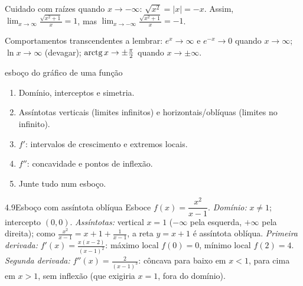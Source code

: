 \begin{nota}
Cuidado com raízes quando $x\to-\infty$: $\sqrt{x^2}=|x|=-x$. Assim,
$\lim_{x\to\infty}\frac{\sqrt{x^2+1}}{x}=1$, mas $\lim_{x\to-\infty}\frac{\sqrt{x^2+1}}{x}=-1$.
\end{nota}

Comportamentos transcendentes a lembrar: $e^x\to\infty$ e $e^{-x}\to0$ quando $x\to\infty$;
$\ln x\to\infty$ (devagar); $\operatorname{arctg} x\to\pm\frac\pi2$ quando $x\to\pm\infty$.

\begin{estrategia}{esboço do gráfico de uma função}
\begin{enumerate}[label=\arabic*.]
\item Domínio, interceptos e simetria.
\item Assíntotas verticais (limites infinitos) e horizontais/oblíquas (limites no infinito).
\item $f'$: intervalos de crescimento e extremos locais.
\item $f''$: concavidade e pontos de inflexão.
\item Junte tudo num esboço.
\end{enumerate}
\end{estrategia}

\begin{exemplo}{4.9}{Esboço com assíntota oblíqua}
Esboce $f(x)=\dfrac{x^2}{x-1}$.
\solucao
\emph{Domínio:} $x\neq1$; intercepto $(0,0)$. \emph{Assíntotas:} vertical $x=1$
($-\infty$ pela esquerda, $+\infty$ pela direita); como $\frac{x^2}{x-1}=x+1+\frac1{x-1}$, a
reta $y=x+1$ é assíntota oblíqua. \emph{Primeira derivada:}
$f'(x)=\frac{x(x-2)}{(x-1)^2}$: máximo local $f(0)=0$, mínimo local $f(2)=4$.
\emph{Segunda derivada:} $f''(x)=\frac2{(x-1)^3}$: côncava para baixo em $x<1$, para cima em
$x>1$, sem inflexão (que exigiria $x=1$, fora do domínio).
\end{exemplo}

